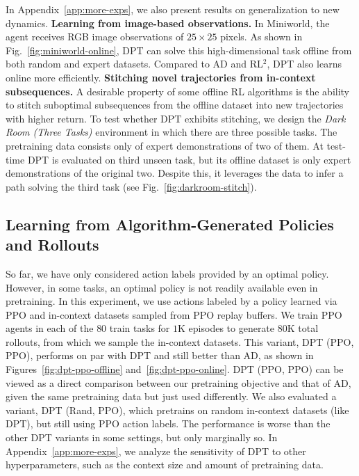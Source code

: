 \documentclass{article}
\newcommand{\macroName}{DPT}
\begin{document}
In Appendix~\ref{app:more-exps}, we also present results on generalization to new dynamics.
\textbf{Learning from image-based observations.} In Miniworld, the agent receives RGB image observations of $25 \times 25$ pixels. As shown in Fig.~\ref{fig:miniworld-online}, \macroName{} can solve this high-dimensional task offline from both random and expert datasets. Compared to AD and RL$^2$, \macroName{} also learns online more efficiently.
\textbf{Stitching novel trajectories from in-context subsequences.} A desirable property of some offline RL algorithms is the ability to stitch suboptimal subsequences from the offline dataset into new trajectories with higher return. To test whether \macroName{} exhibits stitching, we design the \emph{Dark Room (Three Tasks)} environment in which there are three possible tasks. The pretraining data consists only of expert demonstrations of two of them. At test-time \macroName{} is evaluated on third unseen task, but its offline dataset is only expert demonstrations of the original two. Despite this, it leverages the data to infer a path solving the third task (see Fig.~\ref{fig:darkroom-stitch}).
\subsection{Learning from Algorithm-Generated Policies and Rollouts}
\label{subsec:mdp_ppo_data}
So far, we have only considered action labels provided by an optimal policy. However, in some tasks, an optimal policy is not readily available even in pretraining. In this experiment, we use actions labeled by a policy learned via PPO and in-context datasets sampled from PPO replay buffers. We train PPO agents in each of the $80$ train tasks for $1$K episodes to generate $80$K total rollouts, from which we sample the in-context datasets. This variant, \macroName{} (PPO, PPO), performs on par with \macroName{} and still better than AD, as shown in Figures~\ref{fig:dpt-ppo-offline} and~\ref{fig:dpt-ppo-online}. \macroName{} (PPO, PPO) can be viewed as a direct comparison between our pretraining objective and that of AD, given the same pretraining data but just used differently. We also evaluated a variant, \macroName{} (Rand, PPO), which pretrains on random in-context datasets (like \macroName{}), but still using PPO action labels. The performance is worse than the other \macroName{} variants in some settings, but only marginally so. In Appendix~\ref{app:more-exps}, we analyze the sensitivity of \macroName{} to other hyperparameters, such as the context size and amount of pretraining data.
\end{document}
